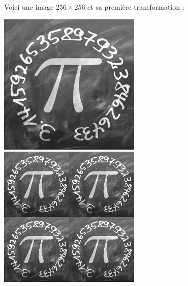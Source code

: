 \documentclass[11pt,class=report,crop=false]{standalone}
\begin{document}
\begin{cours}
Voici une image $256 \times 256$ et sa première transformation :

\begin{center}
\includegraphics[scale=0.4]{images_fiche/pi_gimp_new_photo_0.png}\qquad\qquad
\includegraphics[scale=0.4]{images_fiche/pi_gimp_new_photo_1.png}
\end{center}


\end{cours}
\end{document}

